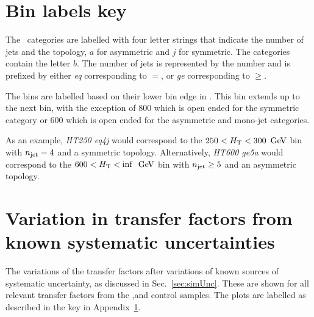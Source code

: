 \clearpage
\section{Bin labels key}
\label{app:plotKey}

The \nj ~categories are labelled with four letter strings that indicate
the number of jets and the topology, $a$ for asymmetric and $j$ for
symmetric. The \nb categories contain the letter $b$. The number of
jets is represented by the number and is prefixed by either \emph{eq}
corresponding to $=$, or \emph{ge} corresponding to $\geq$.

The \HT bins are labelled based on their lower bin edge in \gev. This
bin extends up to the next \HT bin, with the exception of $800$ which
is open ended for the symmetric category or $600$ which is open ended
for the asymmetric and mono-jet categories.

As an example, \emph{HT250 eq4j} would correspond to the
$250<\mbox{$H_\text{T}$}<300~\mathrm{\,Ge\kern -0.1em V}$ bin with $n_{\mathrm{jet}}=4$ and a symmetric topology.
Alternatively, \emph{HT600 ge5a} would correspond to the
$600<\mbox{$H_\text{T}$}<\inf~\mathrm{\,Ge\kern -0.1em V}$ bin with $n_{\mathrm{jet}}\geq5$ and an asymmetric topology.

\section{Variation in transfer factors from known systematic
uncertainties}
\label{app:tfSysts}

The variations of the transfer factors after variations of known
sources of systematic uncertainty, as discussed in
Sec.~\ref{sec:simUnc}. These are shown for all relevant transfer
factors from the \gj,\mj and \mmj control samples. The plots are
labelled as described in the key in Appendix~\ref{app:plotKey}.

